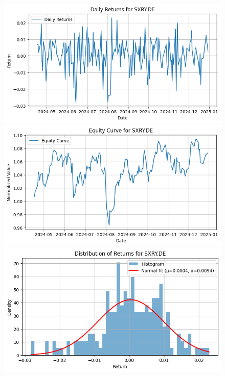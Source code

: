 \documentclass{article}%
\begin{document}
\begin{figure}[htbp]%
\begin{minipage}{0.31\textwidth}%
\includegraphics[width=\linewidth]{ticker_images/SXRY.DE_daily_returns.png}%
\end{minipage}%
\begin{minipage}{0.31\textwidth}%
\includegraphics[width=\linewidth]{ticker_images/SXRY.DE_equity_curve.png}%
\end{minipage}%
\begin{minipage}{0.31\textwidth}%
\includegraphics[width=\linewidth]{ticker_images/SXRY.DE_return_distribution.png}%
\end{minipage}%
\end{figure}
\end{document}
